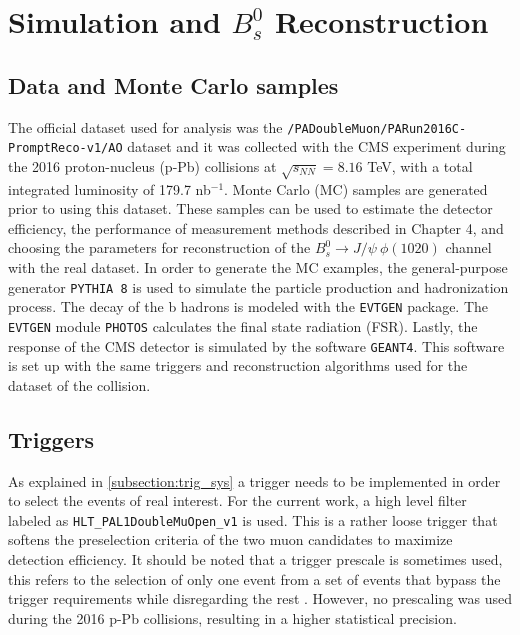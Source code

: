 \chapter[\leavevmode\newline Simulation and $B^0_s$ Reconstruction]{Simulation and $B^0_s$ Reconstruction}
\label{chap:Chapter_3}
\section{Data and Monte Carlo samples}
The official dataset used for analysis was the \verb|/PADoubleMuon/PARun2016C-PromptReco-v1/AO| dataset and it was collected with the CMS experiment during the 2016 proton-nucleus (p-Pb) collisions at $\sqrt{s_{NN}} = 8.16$ TeV, with a total integrated luminosity of 179.7 nb$^{-1}$. Monte Carlo (MC) samples are generated prior to using this dataset. These samples can be used to estimate the detector efficiency, the performance of measurement methods described in Chapter 4, and choosing the parameters for reconstruction  of the $B^0_s \to J/\psi \ \phi(1020)$ channel with the real dataset. In order to generate the MC examples, the general-purpose generator \verb|PYTHIA 8| is used to simulate the particle production and hadronization process. The decay of the b hadrons is modeled with the \verb|EVTGEN| package. The \verb|EVTGEN| module \verb|PHOTOS| calculates the final state radiation (FSR). Lastly, the response of the CMS detector is simulated by the software \verb|GEANT4|. This software is set up with the same triggers and reconstruction algorithms used for the dataset of the collision. %

\section{Triggers}
As explained in \ref{subsection:trig_sys} a trigger needs to be implemented in order to select the events of real interest. For the current work, a high level filter labeled as \verb|HLT_PAL1DoubleMuOpen_v1| is used. This is a rather loose trigger that softens the preselection criteria of the two muon candidates to maximize detection efficiency. It should be noted that a trigger prescale is sometimes used, this refers to the selection of only one event from a set of events that bypass the trigger requirements while disregarding the rest \cite{dorigo_2014}. However, no prescaling was used during the 2016 p-Pb collisions, resulting in a higher statistical precision.

